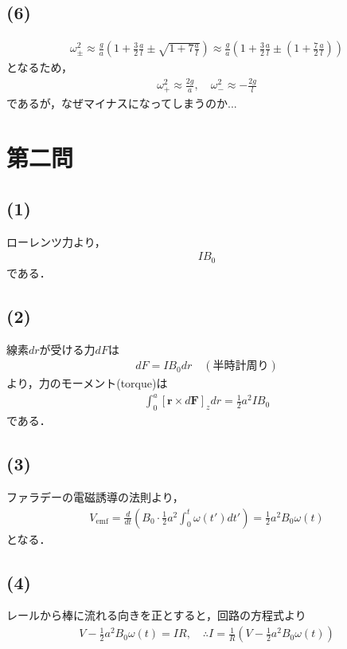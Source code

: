 \documentclass[12pt,dvipdfmx]{jsarticle}
\begin{document}
\subsection*{\large{(6)}}

\begin{eqnarray}
  \omega_{\pm}^2 \approx \frac{g}{a} \left( 1+ \frac{3}{2}\frac{a}{l} \pm \sqrt{ 1+7\frac{a}{l} } \right) \approx \frac{g}{a} \left( 1+ \frac{3}{2}\frac{a}{l} \pm\left( 1 + \frac{7}{2}\frac{a}{l} \right) \right)
\end{eqnarray}
となるため，
\begin{eqnarray}
  \omega_+^2 \approx \frac{2g}{a}, \quad\omega_-^2 \approx -\frac{2g}{l}
\end{eqnarray}
であるが，なぜマイナスになってしまうのか...

\newpage
\section*{\Large{第二問}}
\subsection*{\large{(1)}}
ローレンツ力より，
\begin{eqnarray}
  IB_0
\end{eqnarray}
である．
\subsection*{\large{(2)}}
線素$dr$が受ける力$dF$は
\begin{eqnarray}
  dF = IB_0 dr \quad (半時計周り)
\end{eqnarray}
より，力のモーメント(torque)は
\begin{eqnarray}
  \int_0^{a} [ \bm{r}\times d\bm{F} ]_z dr= \frac{1}{2}a^2 IB_0
\end{eqnarray}
である．
\subsection*{\large{(3)}}
ファラデーの電磁誘導の法則より，
\begin{eqnarray}
  V_{\text{emf}} = \frac{d}{dt}\left( B_0 \cdot \frac{1}{2}a^2 \int_0^{t}\omega(t')dt' \right) = \frac{1}{2}a^2B_0 \omega(t)
\end{eqnarray}
となる．
\subsection*{\large{(4)}}
レールから棒に流れる向きを正とすると，回路の方程式より
\begin{eqnarray}
  V-\frac{1}{2}a^2B_0 \omega(t)  =  IR , \quad\therefore I =\frac{1}{R}\left( V-\frac{1}{2}a^2B_0 \omega(t) \right)
\end{eqnarray}
\end{document}
